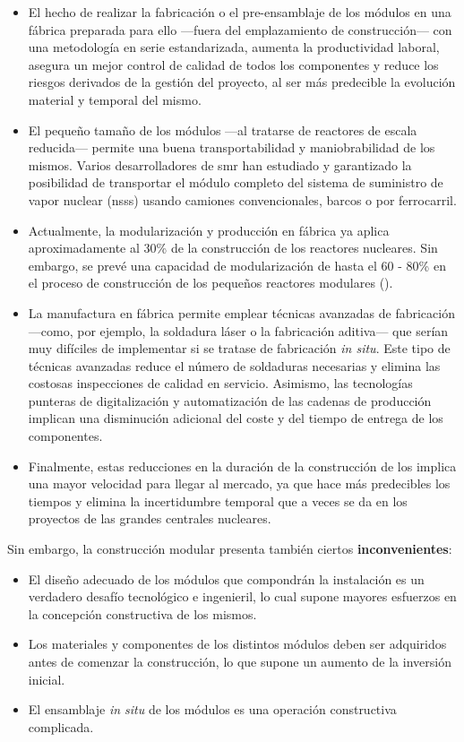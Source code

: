\begin{itemize}
  \item El hecho de realizar la fabricación o el pre-ensamblaje de los módulos en una fábrica preparada para ello ---fuera del emplazamiento de construcción--- con una metodología en serie estandarizada, aumenta la productividad laboral, asegura un mejor control de calidad de todos los componentes y reduce los riesgos derivados de la gestión del proyecto, al ser más predecible la evolución material y temporal del mismo.
  \item El pequeño tamaño de los módulos ---al tratarse de reactores de escala reducida--- permite una buena transportabilidad y maniobrabilidad de los mismos. Varios desarrolladores de \acrshort{smr} han estudiado y garantizado la posibilidad de transportar el módulo completo del sistema de suministro de vapor nuclear (\acrshort{nsss}) usando camiones convencionales, barcos o por ferrocarril.
  \item Actualmente, la modularización y producción en fábrica ya aplica aproximadamente al 30\% de la construcción de los reactores nucleares. Sin embargo, se prevé una capacidad de modularización de hasta el 60 - 80\% en el proceso de construcción de los pequeños reactores modulares (\cite{nea_unlocking_2020}).
  \item La manufactura en fábrica permite emplear técnicas avanzadas de fabricación ---como, por ejemplo, la soldadura láser o la fabricación aditiva--- que serían muy difíciles de implementar si se tratase de fabricación \emph{in situ}. Este tipo de técnicas avanzadas reduce el número de soldaduras necesarias y elimina las costosas inspecciones de calidad en servicio. Asimismo, las tecnologías punteras de digitalización y automatización de las cadenas de producción implican una disminución adicional del coste y del tiempo de entrega de los componentes.
  \item Finalmente, estas reducciones en la duración de la construcción de los  implica una mayor velocidad para llegar al mercado, ya que hace más predecibles los tiempos y elimina la incertidumbre temporal que a veces se da en los proyectos de las grandes centrales nucleares.
\end{itemize}

Sin embargo, la construcción modular presenta también ciertos \textbf{inconvenientes}:

\begin{itemize}
  \item El diseño adecuado de los módulos que compondrán la instalación es un verdadero desafío tecnológico e ingenieril, lo cual supone mayores esfuerzos en la concepción constructiva de los mismos.
  \item Los materiales y componentes de los distintos módulos deben ser adquiridos antes de comenzar la construcción, lo que supone un aumento de la inversión inicial.
  \item El ensamblaje \textit{in situ} de los módulos es una operación constructiva complicada.
\end{itemize}

